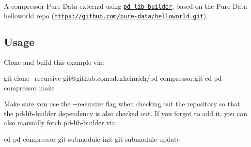 A compressor Pure Data external using \href{https://github.com/pure-data/pd-lib-builder}{\tt pd-\/lib-\/builder}, based on the Pure Data helloworld repo (\href{https://github.com/pure-data/helloworld.git}{\tt https\+://github.\+com/pure-\/data/helloworld.\+git}).

\subsection*{Usage}

Clone and build this example via\+: \begin{DoxyVerb}git clone --recursive git@github.com:alexheinrich/pd-compressor.git
cd pd-compressor
make
\end{DoxyVerb}


Make sure you use the {\ttfamily -\/-\/recursive} flag when checking out the repository so that the pd-\/lib-\/builder dependency is also checked out. If you forgot to add it, you can also manually fetch pd-\/lib-\/builder via\+: \begin{DoxyVerb}cd pd-compressor
git submodule init
git submodule update
\end{DoxyVerb}
 